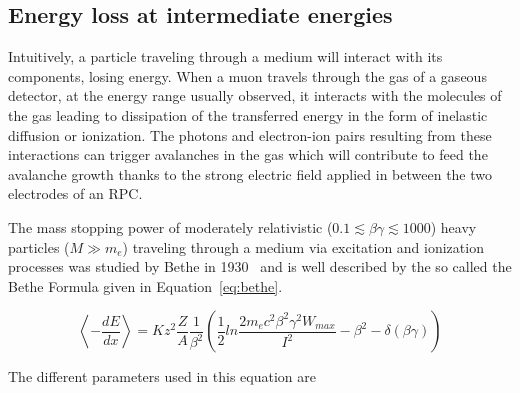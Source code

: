 	\subsection{Energy loss at intermediate energies}
	\label{chapt4:ssec:ElossBethe}
	
	Intuitively, a particle traveling through a medium will interact with its components, losing energy. When a muon travels through the gas of a gaseous detector, at the energy range usually observed, it interacts with the molecules of the gas leading to dissipation of the transferred energy in the form of inelastic diffusion or ionization. The photons and electron-ion pairs resulting from these interactions can trigger avalanches in the gas which will contribute to feed the avalanche growth thanks to the strong electric field applied in between the two electrodes of an RPC.
	
	The mass stopping power of moderately relativistic ($0.1 \lesssim \beta\gamma \lesssim 1000$) heavy particles ($M \gg m_e$) traveling through a medium via excitation and ionization processes was studied by Bethe in 1930~\cite{BETHE1930} and is well described by the so called the Bethe Formula given in Equation~\ref{eq:bethe}.
	
	\begin{equation}
	\label{eq:bethe}
	\left\langle-\frac{dE}{dx}\right\rangle = Kz^2\frac{Z}{A}\frac{1}{\beta^2}\left(\frac{1}{2}ln\frac{2m_ec^2\beta^2\gamma^2W_{max}}{I^2}-\beta^2-\delta(\beta\gamma)\right)
	\end{equation}
	
	The different parameters used in this equation are
	

